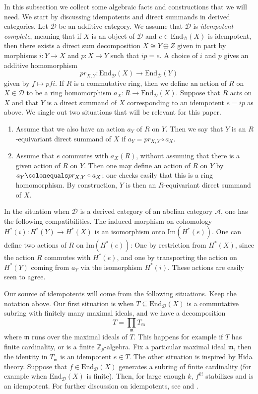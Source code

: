 \documentclass{amsart}
\theoremstyle{remark}
\numberwithin{equation}{subsection}
\newcommand{\Z}{\ZZ}
\newcommand{\ZZ}{{\mathbb Z}}
\newcommand{\cA}{{\mathcal A}}
\newcommand{\cD}{{\mathcal D}}
\newcommand{\Zp}{\Z_p}
\newcommand{\mf}{\mathfrak}
\newcommand{\sub}{\subseteq}
\newcommand{\defeq}{\colonequals}
\renewcommand{\(}{\left(}
\renewcommand{\)}{\right)}
\begin{document}
In this subsection we collect some algebraic facts and constructions that we will need. We start by discussing idempotents and direct summands in derived categories. Let $\cD$ be an additive category. We assume that $\cD$ is \emph{idempotent complete}, meaning that if $X$ is an object of $\cD$ and $e\in \mathrm{End}_{\cD}(X)$ is idempotent, then there exists a direct sum decomposition $X \cong Y \oplus Z$ given in part by morphisms $i : Y \to X$ and $p : X \to Y$ such that $ip=e$. A choice of $i$ and $p$ gives an additive homomorphism
\[
 pr_{X,Y} : \mathrm{End}_{\cD}(X) \to \mathrm{End}_{\cD}(Y)
\]
given by $f \mapsto pfi$. If $R$ is a commutative ring, then we define an action of $R$ on $X \in \cD$ to be a ring homomorphism $a_X : R \to \mathrm{End}_{\cD}(X)$. Suppose that $R$ acts on $X$ and that $Y$ is a direct summand of $X$ corresponding to an idempotent $e=ip$ as above. We single out two situations that will be relevant for this paper. 
\begin{enumerate}
\item Assume that we also have an action $a_Y$ of $R$ on $Y$. Then we say that $Y$ is an $R$-equivariant direct summand of $X$ if $a_Y = pr_{X,Y}\circ a_X$. 
\item Assume that $e$ commutes with $a_X(R)$, without assuming that there is a given action of $R$ on $Y$. Then one may define an action of $R$ on $Y$ by $a_Y \defeq pr_{X,Y}\circ a_X$; one checks easily that this is a ring homomorphism. By construction, $Y$ is then an $R$-equivariant direct summand of $X$.
\end{enumerate}
In the situation when $\cD$ is a derived category of an abelian category $\cA$, one has the following compatibilities. The induced morphism on cohomology $H^\ast(i) : H^\ast(Y) \to H^\ast(X)$ is an isomorphism onto $\mathrm{Im}(H^\ast(e))$. One can define two actions of $R$ on $\mathrm{Im}(H^\ast(e))$: One by restriction from $H^\ast(X)$, since the action $R$ commutes with $H^\ast(e)$, and one by transporting the action on $H^\ast(Y)$ coming from $a_Y$ via the isomorphism $H^\ast(i)$. These actions are easily seen to agree.

\medskip

Our source of idempotents will come from the following situations. Keep the notation above. Our first situation is when $T \sub \mathrm{End}_{\cD}(X)$ is a commutative subring with finitely many maximal ideals, and we have a decomposition 
$$ T = \prod_{\mf{m}}T_\mf{m} $$
where $\mf{m}$ runs over the maximal ideals of $T$. This happens for example if $T$ has finite cardinality, or is a finite $\Zp$-algebra. Fix a particular maximal ideal $\mf{m}$, then the identity in $T_\mf{m}$ is an idempotent $e\in T$. The other situation is inspired by Hida theory. Suppose that $f \in \mathrm{End}_{\cD}(X)$ generates a subring of finite cardinality (for example when $\mathrm{End}_{\cD}(X)$ is finite). Then, for large enough $k$, $f^{k!}$ stabilizes and is an idempotent. For further discussion on idempotents, see \cite[\S 2.4]{khare-thorne} and \cite[\S 3.2]{newton-thorne}.
\end{document}
